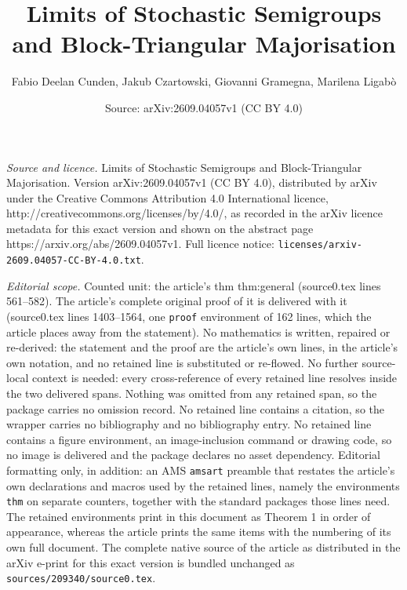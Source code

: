 \documentclass[10pt,a4paper]{amsart}
\title{Limits of Stochastic Semigroups and Block-Triangular Majorisation}
\author{Fabio Deelan Cunden, Jakub Czartowski, Giovanni Gramegna, Marilena Ligab\`o}
\date{Source: arXiv:2609.04057v1 (CC BY 4.0)}
\begin{document}
\maketitle

\noindent\emph{Source and licence.} Limits of Stochastic Semigroups and Block-Triangular Majorisation. Version arXiv:2609.04057v1 (CC BY 4.0), distributed by arXiv under the Creative Commons Attribution 4.0 International licence, http://creativecommons.org/licenses/by/4.0/, as recorded in the arXiv licence metadata for this exact version and shown on the abstract page https://arxiv.org/abs/2609.04057v1. Full licence notice: \texttt{licenses/arxiv-2609.04057-CC-BY-4.0.txt}.\par\smallskip

\noindent\textit{Editorial scope.} Counted unit: the article's thm thm:general (source0.tex lines 561--582). The article's complete original proof of it is delivered with it (source0.tex lines 1403--1564, one \texttt{proof} environment of 162 lines, which the article places away from the statement). No mathematics is written, repaired or re-derived: the statement and the proof are the article's own lines, in the article's own notation, and no retained line is substituted or re-flowed.  No further source-local context is needed: every cross-reference of every retained line resolves inside the two delivered spans.  Nothing was omitted from any retained span, so the package carries no omission record.  No retained line contains a citation, so the wrapper carries no bibliography and no bibliography entry.  No retained line contains a figure environment, an image-inclusion command or drawing code, so no image is delivered and the package declares no asset dependency.  Editorial formatting only, in addition: an AMS \texttt{amsart} preamble that restates the article's own declarations and macros used by the retained lines, namely the environments \texttt{thm} on separate counters, together with the standard packages those lines need.  The retained environments print in this document as Theorem 1 in order of appearance, whereas the article prints the same items with the numbering of its own full document.  The complete native source of the article as distributed in the arXiv e-print for this exact version is bundled unchanged as \texttt{sources/209340/source0.tex}.
\end{document}
